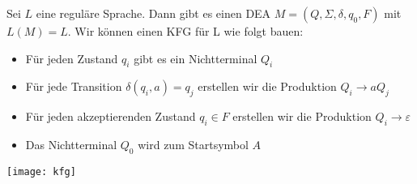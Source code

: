 Sei $L$ eine reguläre Sprache.
Dann gibt es einen DEA $M = (Q, \Sigma, \delta, q_0, F)$ mit $L(M) = L$.
Wir können einen KFG für L wie folgt bauen:
\begin{itemize}
    \item Für jeden Zustand $q_i$ gibt es ein Nichtterminal $Q_i$
    \item Für jede Transition $\delta(q_i, a) = q_j$ erstellen wir die Produktion $Q_i \rightarrow a Q_j$
    \item Für jeden akzeptierenden Zustand $q_i \in F$ erstellen wir die Produktion $Q_i \rightarrow \varepsilon$
    \item Das Nichtterminal $Q_0$ wird zum Startsymbol $A$
\end{itemize}

\texttt{[image: kfg]}%